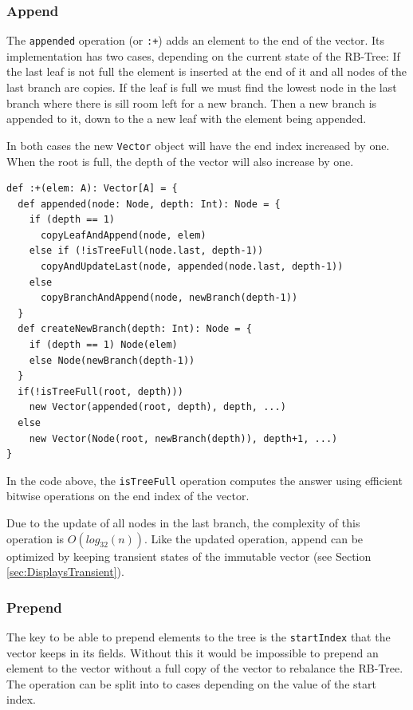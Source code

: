 
\subsubsection{Append}
The \texttt{appended} operation  (or \texttt{:+}) adds an element to the end of the vector. Its implementation has two cases, depending on the current state of the RB-Tree: If the last leaf is not full the element is inserted at the end of it and all nodes of the last branch are copies. If the leaf is full we must find the lowest node in the last branch where there is sill room left for a new branch. Then a new branch is appended to it, down to the a new leaf with the element being appended. 

In both cases the new \texttt{Vector} object will have the end index increased by one. When the root is full, the depth of the vector will also increase by one.

\begin{lstlisting}[frame=single]
def :+(elem: A): Vector[A] = {
  def appended(node: Node, depth: Int): Node = {
    if (depth == 1) 
      copyLeafAndAppend(node, elem)
    else if (!isTreeFull(node.last, depth-1)) 
      copyAndUpdateLast(node, appended(node.last, depth-1))
    else
      copyBranchAndAppend(node, newBranch(depth-1))
  }
  def createNewBranch(depth: Int): Node = {
    if (depth == 1) Node(elem)
    else Node(newBranch(depth-1))
  }
  if(!isTreeFull(root, depth))) 
    new Vector(appended(root, depth), depth, ...)
  else 
    new Vector(Node(root, newBranch(depth)), depth+1, ...)
}
\end{lstlisting}

In the code above, the \texttt{isTreeFull} operation computes the answer using efficient bitwise operations on the end index of the vector.

Due to the update of all nodes in the last branch, the complexity of this operation is $O(log_{32}(n))$. Like the updated operation, append can be optimized by keeping transient states of the immutable vector (see Section \ref{sec:DisplaysTransient}).

\subsubsection{Prepend}
The key to be able to prepend  elements to the tree is the \texttt{startIndex} that the vector keeps in its fields. Without this it would be impossible to prepend an element to the vector without a full copy of the vector to rebalance the RB-Tree. The operation can be split into to cases depending on the value of the start index.

